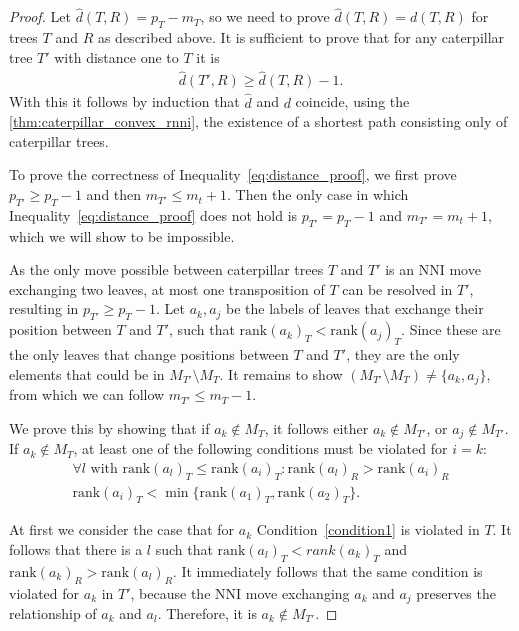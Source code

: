 \documentclass[11pt]{amsart}
\newcommand{\rank}{\mathrm{rank}}
\newcommand{\nni}{\mathrm{NNI}}
\begin{document}
\begin{proof}
	Let $\hat d(T,R) = p_T - m_T$, so we need to prove $\hat d(T,R) = d(T,R)$ for trees $T$ and $R$ as described above.
	It is sufficient to prove that for any caterpillar tree $T'$ with distance one to $T$ it is
	\begin{align}
		\hat d(T',R) \geq \hat d(T,R) - 1.
		\label{eq:distance_proof}
	\end{align}
	With this it follows by induction that $\hat d$ and $d$ coincide, using the \autoref{thm:caterpillar_convex_rnni}, the existence of a shortest path consisting only of caterpillar trees.

	To prove the correctness of Inequality~\ref{eq:distance_proof}, we first prove $p_{T'} \geq p_T - 1$ and then $m_{T'} \leq m_t + 1$.
	Then the only case in which Inequality~\ref{eq:distance_proof} does not hold is $p_{T'} = p_T - 1$ and $m_{T'} = m_t + 1$, which we will show to be impossible.

	As the only move possible between caterpillar trees $T$ and $T'$ is an $\nni$ move exchanging two leaves, at most one transposition of $T$ can be resolved in $T'$, resulting in $p_{T'} \geq p_T - 1$.
	Let $a_k, a_j$ be the labels of leaves that exchange their position between $T$ and $T'$, such that $\rank(a_k)_T < \rank(a_j)_T$.
	Since these are the only leaves that change positions between $T$ and $T'$, they are the only elements that could be in $M_{T'} \setminus M_T$.
	It remains to show $(M_{T'} \setminus M_T) \neq \{a_k, a_j\}$, from which we can follow $m_{T'} \leq m_T - 1$.

	We prove this by showing that if $a_k \notin M_T$, it follows either $a_k \notin M_{T'}$, or $a_j \notin M_{T'}$.
	If $a_k \notin M_T$, at least one of the following conditions must be violated for $i = k$:
	\setcounter{equation}{0}
	\renewcommand{\theequation}{C\arabic{equation}}
	\begin{align}
		\forall l \text{ with } \rank(a_l)_T \leq \rank(a_i)_T: \rank(a_l)_R > \rank(a_i)_R \label{condition1}\\
		\rank(a_i)_T < \min\{\rank(a_1)_T, \rank(a_2)_T\}.
		\label{condition2}
	\end{align}
	\setcounter{equation}{1}
	\renewcommand{\theequation}{\arabic{equation}}

	At first we consider the case that for $a_k$ Condition~\ref{condition1} is violated in $T$.
	It follows that there is a $l$ such that $\rank(a_l)_T < rank(a_k)_T$ and $\rank(a_k)_R > \rank(a_l)_R$.
	It immediately follows that the same condition is violated for $a_k$ in $T'$, because the $\nni$ move exchanging $a_k$ and $a_j$ preserves the relationship of $a_k$ and $a_l$.
	Therefore, it is $a_k \notin M_{T'}$.


\end{proof}
\end{document}

